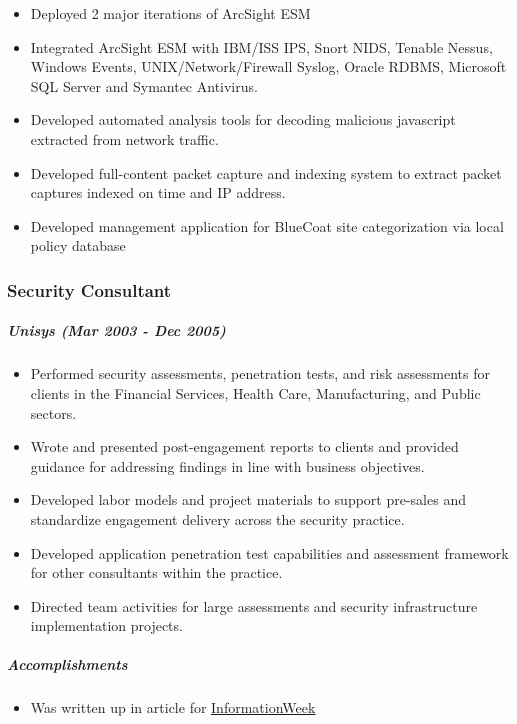 \documentclass[10pt,]{article}
\providecommand{\tightlist}{%
  \setlength{\itemsep}{0pt}\setlength{\parskip}{0pt}}
\let\oldsubparagraph\subparagraph
\renewcommand{\subparagraph}[1]{\oldsubparagraph{#1}\mbox{}}
\begin{document}
\begin{itemize}
\tightlist
\item
  Deployed 2 major iterations of ArcSight ESM
\item
  Integrated ArcSight ESM with IBM/ISS IPS, Snort NIDS, Tenable Nessus,
  Windows Events, UNIX/Network/Firewall Syslog, Oracle RDBMS, Microsoft
  SQL Server and Symantec Antivirus.
\item
  Developed automated analysis tools for decoding malicious javascript
  extracted from network traffic.
\item
  Developed full-content packet capture and indexing system to extract
  packet captures indexed on time and IP address.
\item
  Developed management application for BlueCoat site categorization via
  local policy database
\end{itemize}

\subsubsection{Security Consultant}\label{security-consultant}

\subparagraph{\texorpdfstring{\emph{Unisys} (Mar 2003 - Dec
2005)}{Unisys (Mar 2003 - Dec 2005)}}\label{unisys-mar-2003---dec-2005}

\begin{itemize}
\tightlist
\item
  Performed security assessments, penetration tests, and risk
  assessments for clients in the Financial Services, Health Care,
  Manufacturing, and Public sectors.
\item
  Wrote and presented post-engagement reports to clients and provided
  guidance for addressing findings in line with business objectives.
\item
  Developed labor models and project materials to support pre-sales and
  standardize engagement delivery across the security practice.
\item
  Developed application penetration test capabilities and assessment
  framework for other consultants within the practice.
\item
  Directed team activities for large assessments and security
  infrastructure implementation projects.
\end{itemize}

\subparagraph{Accomplishments}\label{accomplishments-3}

\begin{itemize}
\tightlist
\item
  Was written up in article for
  \href{http://www.informationweek.com/hack-in-progress/d/d-id/1020652}{InformationWeek}
\end{itemize}
\end{document}
